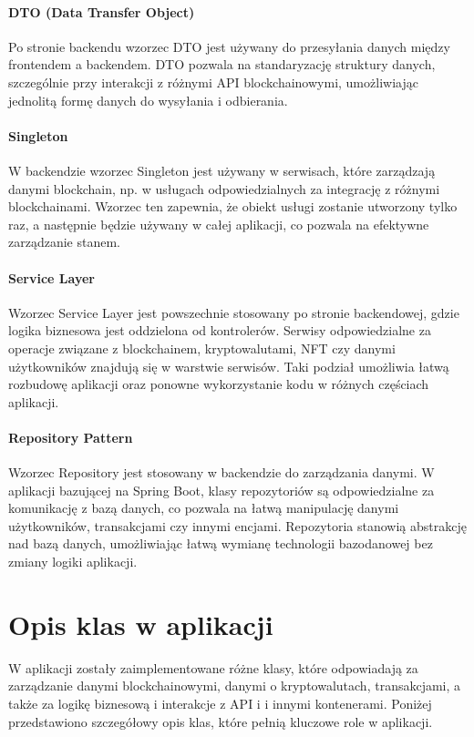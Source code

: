 \paragraph{DTO (Data Transfer Object)}
Po stronie backendu wzorzec DTO jest używany do przesyłania danych między frontendem a backendem. DTO pozwala na standaryzację struktury danych, szczególnie przy interakcji z różnymi API blockchainowymi, umożliwiając jednolitą formę danych do wysyłania i odbierania.

\paragraph{Singleton}
W backendzie wzorzec Singleton jest używany w serwisach, które zarządzają danymi blockchain, np. w usługach odpowiedzialnych za integrację z różnymi blockchainami. Wzorzec ten zapewnia, że obiekt usługi zostanie utworzony tylko raz, a następnie będzie używany w całej aplikacji, co pozwala na efektywne zarządzanie stanem.

\paragraph{Service Layer}
Wzorzec Service Layer jest powszechnie stosowany po stronie backendowej, gdzie logika biznesowa jest oddzielona od kontrolerów. Serwisy odpowiedzialne za operacje związane z blockchainem, kryptowalutami, NFT czy danymi użytkowników znajdują się w warstwie serwisów. Taki podział umożliwia łatwą rozbudowę aplikacji oraz ponowne wykorzystanie kodu w różnych częściach aplikacji.

\paragraph{Repository Pattern}
Wzorzec Repository jest stosowany w backendzie do zarządzania danymi. W aplikacji bazującej na Spring Boot, klasy repozytoriów są odpowiedzialne za komunikację z bazą danych, co pozwala na łatwą manipulację danymi użytkowników, transakcjami czy innymi encjami. Repozytoria stanowią abstrakcję nad bazą danych, umożliwiając łatwą wymianę technologii bazodanowej bez zmiany logiki aplikacji.

\section{Opis klas w aplikacji}

W aplikacji zostały zaimplementowane różne klasy, które odpowiadają za zarządzanie danymi blockchainowymi, danymi o kryptowalutach, transakcjami, a także za logikę biznesową i interakcje z API i i innymi kontenerami. Poniżej przedstawiono szczegółowy opis klas, które pełnią kluczowe role w aplikacji.


